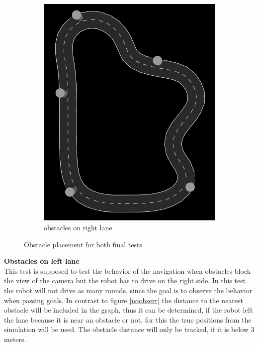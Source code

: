 \begin{figure}[H]
\begin{subfigure}{.5\linewidth}
		\includegraphics[width=\textwidth]{Pictures/right final obs}
		\caption{obstacles on right lane}
	\end{subfigure}

	\caption{Obstacle placement for both final tests}
	\label{obstaclefinaltest}

\end{figure}
\textbf{Obstacles on left lane}\\
This test is supposed to test the behavior of the navigation when obstacles block the view of the camera but the robot has to drive on the right side. In this test the robot will not drive as many rounds, since the goal is to observe the behavior when passing goals. In contrast to figure \ref{noobserr} the distance to the nearest obstacle will be included in the graph, thus it can be determined, if the robot left the lane because it is near an obstacle or not, for this the true positions from the simulation will be used. The obstacle distance will only be tracked, if it is below 3 meters.
